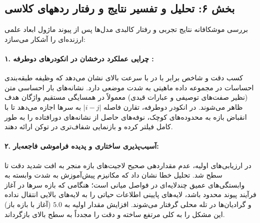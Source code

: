 \subsection*{بخش ۶: تحلیل و تفسیر نتایج و رفتار ردههای کلاسی }
بررسی موشکافانه نتایج تجربی و رفتار کالبدی مدل‌ها پس از پیوند ماژول  ابعاد علمی ارزنده‌ای را آشکار می‌سازد:

\paragraph{۱. چرایی عملکرد درخشان در انکودرهای دوطرفه :}
کسب دقت  و شاخص  برابر با  در  با سرعت بالای  نشان می‌دهد که وظیفه طبقه‌بندی احساسات در مجموعه داده  ماهیتی به شدت موضعی دارد. نشانه‌های بار احساسی متن (نظیر صفت‌های توصیفی و عبارات قیدی) معمولاً در همسایگی مستقیم واژگان هدف ظاهر می‌شوند. در انکودر دوطرفه، تقارن فاصله $|i - j|$ به سرها اجازه می‌دهد تا با انقباض بازه به محدوده‌های کوچک، نوفه‌های حاصل از نشانه‌های دورافتاده را به طور کامل فیلتر کرده و بازنمایی شفاف‌تری در توکن \lr{[CLS]} ارائه دهند.

\paragraph{۲. آسیب‌پذیری ساختاری  و پدیده فراموشی فاجعه‌بار:}
در ارزیابی‌های اولیه، عدم مقداردهی صحیح لاجیت‌های بازه منجر به افت شدید دقت  تا سطح  شد. تحلیل خطا نشان داد که مکانیزم پیش‌آموزش  به شدت وابسته به وابستگی‌های عمیق چندلایه‌ای در فواصل میانی است؛ هنگامی که بازه سرها در آغاز فرآیند پیوند محدود باشد، لایه‌های پایینی اطلاعات حیاتی را به لایه‌های بالایی انتقال نداده و گرادیان‌ها در تله محلی گرفتار می‌شوند. افزایش مقدار اولیه  به $5.0$ (آغاز با بازه باز) این مشکل را به کلی مرتفع ساخته و دقت را مجدداً به سطح بالای  بازگرداند.

